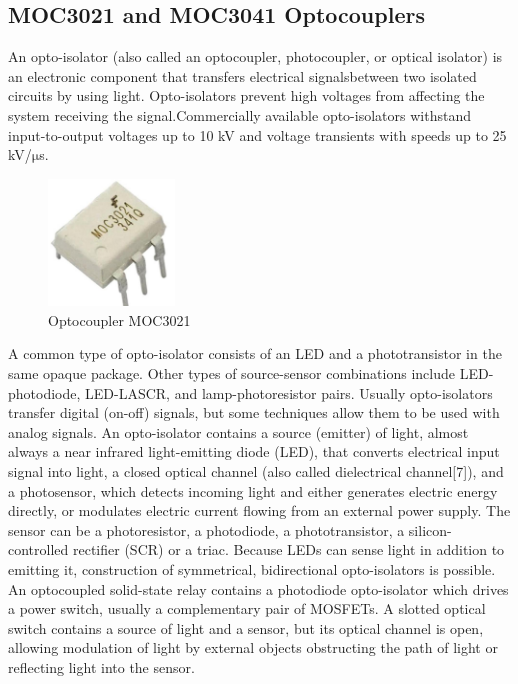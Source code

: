 \subsection{MOC3021 and MOC3041 Optocouplers}
An opto-isolator (also called an optocoupler, photocoupler, or optical isolator) is an electronic component that transfers electrical signalsbetween two isolated circuits by using light. Opto-isolators prevent high voltages from affecting the system receiving the signal.Commercially available opto-isolators withstand input-to-output voltages up to 10 kV and voltage transients with speeds up to 25 kV/$ \si\micro $s.\\
\begin{figure}
	\includegraphics[width=0.3\textwidth]{photos/theory/moc3021.jpg}
	\caption{Optocoupler MOC3021}
\end{figure}
A common type of opto-isolator consists of an LED and a phototransistor in the same opaque package. Other types of source-sensor combinations include LED-photodiode, LED-LASCR, and lamp-photoresistor pairs. Usually opto-isolators transfer digital (on-off) signals, but some techniques allow them to be used with analog signals.
An opto-isolator contains a source (emitter) of light, almost always a near infrared light-emitting diode (LED), that converts electrical input signal into light, a closed optical channel (also called dielectrical channel[7]), and a photosensor, which detects incoming light and either generates electric energy directly, or modulates electric current flowing from an external power supply. The sensor can be a photoresistor, a photodiode, a phototransistor, a silicon-controlled rectifier (SCR) or a triac. Because LEDs can sense light in addition to emitting it, construction of symmetrical, bidirectional opto-isolators is possible. An optocoupled solid-state relay contains a photodiode opto-isolator which drives a power switch, usually a complementary pair of MOSFETs. A slotted optical switch contains a source of light and a sensor, but its optical channel is open, allowing modulation of light by external objects obstructing the path of light or reflecting light into the sensor.

